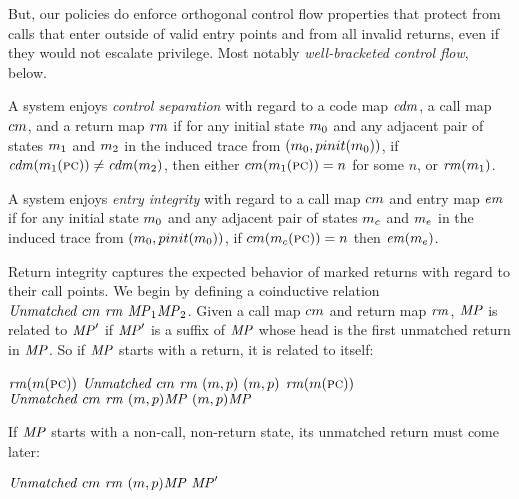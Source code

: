 \documentclass[acmsmall,review,anonymous]{acmart}\settopmatter{printfolios=true,printccs=false,printacmref=false}
\begin{document}
    But, our policies do enforce orthogonal control flow properties that
    protect from calls that enter outside of valid entry points and from all
    invalid returns, even if they would not escalate privilege. Most notably
    {\em well-bracketed control flow}, below.

A system enjoys {\em control separation} with regard to a code map
\(\mathit{cdm}\), a call map \(cm\), and a return map \(\mathit{rm}\) if
for any initial state \(m_0\) and any adjacent pair of states
\(m_1\) and \(m_2\) in the induced trace from
\((m_0,pinit(m_0))\), if
\(\mathit{cdm}(m_1(\textsc{pc})) \not = \mathit{cdm}(m_2)\), then either
\(cm(m_1(\textsc{pc})) = n\) for some \(n\), or
\(\mathit{rm}(m_1)\).

A system enjoys {\em entry integrity} with regard to a call map
\(cm\) and entry map \(\mathit{em}\) if for any initial state
\(m_0\) and any adjacent pair of states \(m_c\) and
\(m_e\) in the induced trace from
\((m_0,pinit(m_0))\), if
\(cm(m_c(\textsc{pc})) = n\) then \(\mathit{em}(m_e)\).

Return integrity captures the expected behavior of marked returns with
regard to their call points. We begin by defining a coinductive
relation \(\mathit{Unmatched}\ \callmap\ \retmap\ \MPT_1
\MPT_2\). Given a call map \(cm\) and return map \(\mathit{rm}\),
\(\mathit{MP}\) is related to \(\mathit{MP}'\) if \(\mathit{MP}'\) is a suffix of \(\mathit{MP}\)
whose head is the first unmatched return in \(\mathit{MP}\). So if \(\mathit{MP}\)
starts with a return, it is related to itself:

  \judgmenttwo{\(\callmap(\mach(\PCname)) = \bot\)}
           {\(\mathit{rm}(m(\textsc{pc}))\)}
      {\(\mathit{Unmatched}\ \callmap\ \retmap\ \mpstate{\mach}{\pol}\
        \mpstate{\mach}{\pol}\)}
  \judgmenttwo{\(\callmap(\mach(\PCname)) = \bot\)}
              {\(\mathit{rm}(m(\textsc{pc}))\)}
      {\(\mathit{Unmatched}\ \callmap\ \retmap\ \mpstate{\mach}{\pol}\MPT\
              \mpstate{\mach}{\pol}\MPT\)}

If \(\mathit{MP}\) starts with a non-call, non-return state, its unmatched
return must come later:

           {\(\mathit{Unmatched}\ \callmap\ \retmap\
            \mpstate{\mach}{\pol}\MPT\ \MPT'\)}
\end{document}
